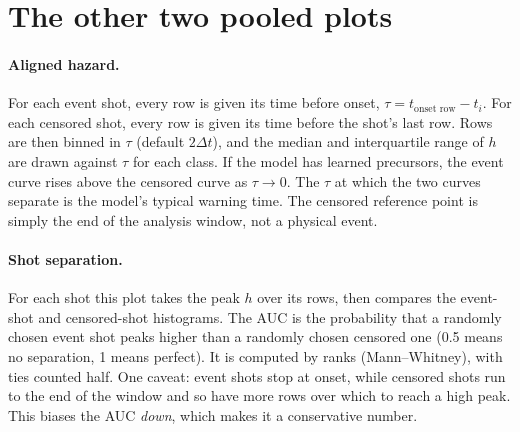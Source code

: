 \documentclass[11pt]{article}
\begin{document}
\section{The other two pooled plots}\label{sec:other}

\paragraph{Aligned hazard.}
For each event shot, every row is given its time before onset,
$\tau=t_{\text{onset row}}-t_i$. For each censored shot, every row is given its
time before the shot's last row. Rows are then binned in $\tau$ (default
$2\Delta t$), and the median and interquartile range of $h$ are drawn against
$\tau$ for each class. If the model has learned precursors, the event curve
rises above the censored curve as $\tau\to0$. The $\tau$ at which the two
curves separate is the model's typical warning time. The censored reference
point is simply the end of the analysis window, not a physical event.

\paragraph{Shot separation.}
For each shot this plot takes the peak $h$ over its rows, then compares the
event-shot and censored-shot histograms. The AUC is the probability that a
randomly chosen event shot peaks higher than a randomly chosen censored one
(0.5 means no separation, 1 means perfect). It is computed by ranks
(Mann--Whitney), with ties counted half. One caveat: event shots stop at
onset, while censored shots run to the end of the window and so have more rows
over which to reach a high peak. This biases the AUC \emph{down}, which makes
it a conservative number.
\end{document}
